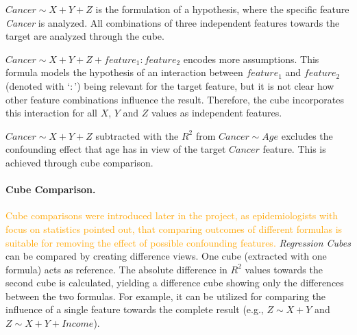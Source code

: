 \documentclass[journal]{style/vgtc} 			          %
\newcommand{\design}[1]{\textcolor{orange}{#1}}
\begin{document}
$Cancer \sim X + Y + Z$ is the formulation of a hypothesis, where the specific feature \textit{Cancer} is analyzed.
All combinations of three independent features towards the target are analyzed through the cube.

$Cancer \sim X + Y + Z + feature_1:feature_2$ encodes more assumptions.
This formula models the hypothesis of an interaction between $feature_1$ and $feature_2$ (denoted with `$:$') being relevant for the target feature, but it is not clear how other feature combinations influence the result.
Therefore, the cube incorporates this interaction for all $X$, $Y$ and $Z$ values as independent features.

$Cancer \sim X + Y + Z$ subtracted with the $R^2$ from $Cancer \sim Age$ excludes the confounding effect that age has in view of the target $Cancer$ feature.
This is achieved through cube comparison.

\paragraph{Cube Comparison.}
\design{
Cube comparisons were introduced later in the project, as epidemiologists with focus on statistics pointed out, that comparing outcomes of different formulas is suitable for removing the effect of possible confounding features.
}
\emph{Regression Cubes} can be compared by creating difference views.
One cube (extracted with one formula) acts as reference.
The absolute difference in $R^2$ values towards the second cube is calculated, yielding a difference cube showing only the differences between the two formulas.
For example, it can be utilized for comparing the influence of a single feature towards the complete result (e.g., $Z \sim X + Y$ and $Z \sim X + Y + Income$).
\end{document}
